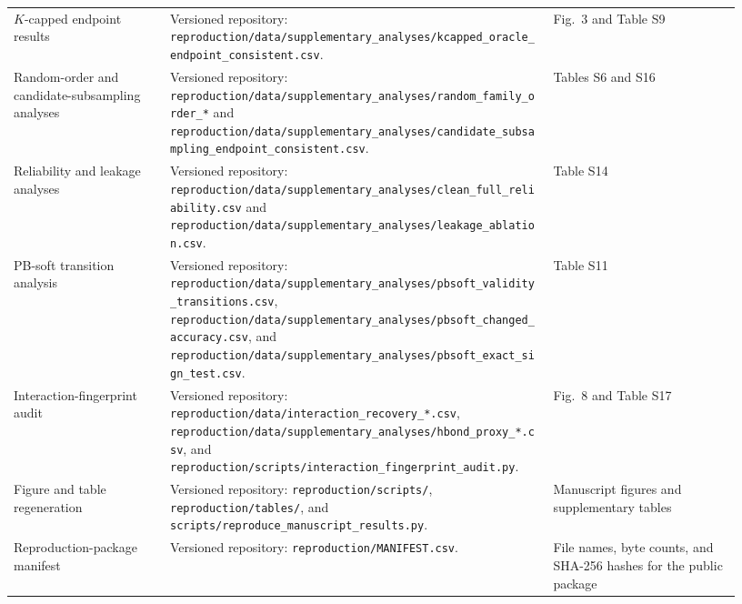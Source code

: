 \begin{longtable}{@{}>{\raggedright\arraybackslash}p{0.20\linewidth}>{\raggedright\arraybackslash}p{0.49\linewidth}>{\raggedright\arraybackslash}p{0.24\linewidth}@{}}
$K$-capped endpoint results & Versioned repository: \nolinkurl{reproduction/data/supplementary_analyses/kcapped_oracle_endpoint_consistent.csv}. & Fig.~3 and Table S9\\
Random-order and candidate-subsampling analyses & Versioned repository: \nolinkurl{reproduction/data/supplementary_analyses/random_family_order_*} and \nolinkurl{reproduction/data/supplementary_analyses/candidate_subsampling_endpoint_consistent.csv}. & Tables S6 and S16\\
Reliability and leakage analyses & Versioned repository: \nolinkurl{reproduction/data/supplementary_analyses/clean_full_reliability.csv} and \nolinkurl{reproduction/data/supplementary_analyses/leakage_ablation.csv}. & Table S14\\
PB-soft transition analysis & Versioned repository: \nolinkurl{reproduction/data/supplementary_analyses/pbsoft_validity_transitions.csv}, \nolinkurl{reproduction/data/supplementary_analyses/pbsoft_changed_accuracy.csv}, and \nolinkurl{reproduction/data/supplementary_analyses/pbsoft_exact_sign_test.csv}. & Table S11\\
Interaction-fingerprint audit & Versioned repository: \nolinkurl{reproduction/data/interaction_recovery_*.csv}, \nolinkurl{reproduction/data/supplementary_analyses/hbond_proxy_*.csv}, and \nolinkurl{reproduction/scripts/interaction_fingerprint_audit.py}. & Fig.~8 and Table S17\\
Figure and table regeneration & Versioned repository: \nolinkurl{reproduction/scripts/}, \nolinkurl{reproduction/tables/}, and \nolinkurl{scripts/reproduce_manuscript_results.py}. & Manuscript figures and supplementary tables\\
Reproduction-package manifest & Versioned repository: \nolinkurl{reproduction/MANIFEST.csv}. & File names, byte counts, and SHA-256 hashes for the public package\\
\end{longtable}
\endgroup
